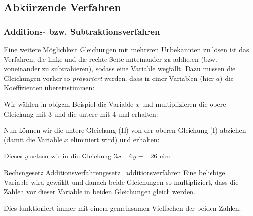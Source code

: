   \newpage

\subsection{Abkürzende Verfahren}
\subsubsection{Additions- bzw. Subtraktionsverfahren}
Eine weitere Möglichkeit Gleichungen mit mehreren Unbekannten zu lösen ist das Verfahren, die linke und die rechte Seite miteinander zu addieren (bzw. voneinander zu subtrahieren), sodass eine Variable wegfällt. Dazu müssen die Gleichungen vorher so \textit{präpariert} werden, dass in einer Variablen (hier \zB $a$) die Koeffizienten übereinstimmen:


Wir wählen \zB in obigem Beispiel die Variable $x$ und multiplizieren die obere Gleichung mit 3 und die untere mit 4 und
erhalten:




Nun können wir die untere Gleichung (II) von der oberen Gleichung (I) abziehen (damit die Variable $x$ eliminiert wird)
und erhalten:
  


  Dieses $y$ setzen wir \zB in die Gleichung $3x-6y=-26$ ein:
\newpage


  \begin{rezept}{Rechengesetz Additionsverfahren}{gesetz_additionsverfahren}
    Eine beliebige Variable wird gewählt und danach beide Gleichungen so multipliziert,
    dass die Zahlen vor dieser Variable in beiden Gleichungen gleich werden.

    Dies funktioniert
    immer mit einem gemeinsamen Vielfachen der beiden Zahlen.
  \end{rezept}


